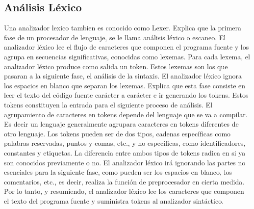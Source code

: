 \subsection{Análisis Léxico}
Una analizador lexico tambien es conocido como Lexer. \cite{Aho2008} Explica que la primera fase de un procesador de lenguaje, se le llama análisis léxico o escaneo. El analizador léxico lee el flujo de caracteres que componen el programa fuente y los agrupa en secuencias significativas, conocidas como lexemas. Para cada lexema, el analizador léxico produce como salida un token. Estos lexemas son los que pasaran a la siguiente fase, el análisis de la sintaxis. El analizador léxico ignora los espacios en blanco que separan los lexemas. \cite{catalan2010compiladores} Explica que esta fase consiste en leer el texto del código fuente carácter a carácter e ir generando los tokens. Estos tokens constituyen la entrada para el siguiente proceso de análisis. El agrupamiento de caracteres en tokens depende del lenguaje que se va a compilar. Es decir un lenguaje generalmente agrupara caracteres en tokens diferentes de otro lenguaje. Los tokens pueden ser de dos tipos, cadenas específicas como palabras reservadas, puntos y comas, etc., y no específicas, como identificadores, constantes y etiquetas. La diferencia entre ambos tipos de tokens radica en si ya son conocidos previamente o no. El analizador léxico irá ignorando las partes no esenciales para la siguiente fase, como pueden ser los espacios en blanco, los comentarios, etc., es decir, realiza la función de preprocesador en cierta medida. Por lo tanto, y resumiendo, el analizador léxico lee los caracteres que componen el texto del programa fuente y suministra tokens al analizador sintáctico.

